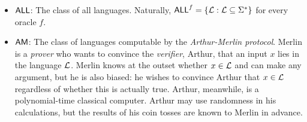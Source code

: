 \begin{itemize}
\item $\mathsf{ALL}$: The class of all languages. Naturally,
  $\mathsf{ALL}^f=\{\mathcal{L}:\mathcal{L}\subseteq\Sigma^*\}$ for every oracle $f$.
\item $\mathsf{AM}$: The class of languages computable by the \textit{Arthur-Merlin
    protocol}. Merlin is a \textit{prover} who wants to convince the
  \textit{verifier}, Arthur, that an input $x$ lies in the language
  $\mathcal{L}$. Merlin knows at the outset whether $x\in\mathcal{L}$ and can make any argument,
  but he is also biased: he wishes to convince Arthur that $x\in\mathcal{L}$ regardless
  of whether this is actually true. Arthur, meanwhile, is a polynomial-time
  classical computer. Arthur may use randomness in his calculations, but the
  results of his coin tosses are known to Merlin in advance.


\end{itemize}
